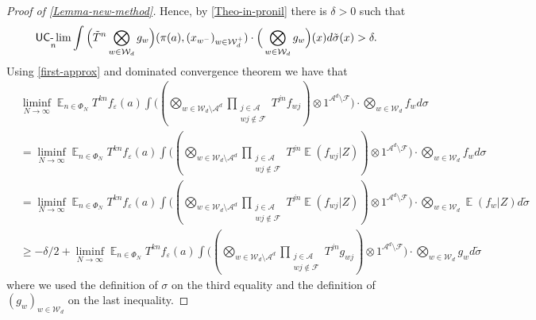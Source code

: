 \documentclass[letter,11pt]{article}
\theoremstyle{definition}
\newcommand{\sF}{\mathcal{F}}
\newcommand{\sA}{\mathcal{A}}
\newcommand{\bE}{\mathop{\mathbb{E}}}
\newcommand{\uclim}{\mathop{\textup{\textsf{UC-}}\lim}}
\begin{document}
\begin{proof}[Proof of \cref{Lemma-new-method}]
Hence, by \cref{Theo-in-pronil} there is $\delta>0$ such that 
\begin{equation}\label{uniform-bound-uclim}
     \uclim_{n}\int    \Big( \tilde{T}^n  \bigotimes_{w\in \mathcal{W}_d} g_{w}\Big)(\pi(a), (x_{w^-})_{w\in \mathcal{W}_d^{+}} )\cdot \Big(\bigotimes_{w\in \mathcal{W}_d}g_{w}  \Big)(x) d\tilde{\sigma}(x)  >\delta.
\end{equation}
Using \cref{first-approx} and dominated convergence theorem we have that 
\begin{align*}
    & \liminf_{N\to\infty}  \bE_{n\in \Phi_N}  T^{kn} f_\varepsilon(a) \int  \Big( (\bigotimes_{w\in \mathcal{W}_{d}\setminus\sA^d}  \prod_{\substack{j\in\sA\\wj\notin \sF}} T^{jn}f_{wj} )\otimes 1^{\sA^d\setminus \sF} \Big) \cdot  \bigotimes_{w\in \mathcal{W}_d}f_{w}d\sigma \\
    & =\liminf_{N\to\infty}  \bE_{n\in \Phi_N}  T^{kn} f_\varepsilon(a) \int  \Big( (\bigotimes_{w\in \mathcal{W}_{d}\setminus\sA^d}  \prod_{\substack{j\in\sA\\ wj\notin \sF}}T^{jn}\bE(f_{wj}|Z) )\otimes 1^{\sA^d\setminus \sF} \Big) \cdot \bigotimes_{w\in \mathcal{W}_d}f_{w}d\sigma \\
    & =\liminf_{N\to\infty}  \bE_{n\in \Phi_N}  T^{kn} f_\varepsilon(a) \int  \Big( (\bigotimes_{w\in \mathcal{W}_{d}\setminus\sA^d}  \prod_{\substack{j\in\sA\\ wj\notin \sF}}T^{jn}\bE(f_{wj}|Z) )\otimes 1^{\sA^d\setminus \sF} \Big) \cdot \bigotimes_{w\in \mathcal{W}_d}\bE(f_{w}|Z)d\tilde{\sigma} \\
    &\geq - \delta/2 + \liminf_{N\to\infty}  \bE_{n\in \Phi_N}  T^{kn} f_\varepsilon(a) \int  \Big( (\bigotimes_{w\in \mathcal{W}_{d}\setminus\sA^d}  \prod_{\substack{j\in\sA\\ wj\notin \sF}}T^{jn}g_{wj} )\otimes 1^{\sA^d\setminus \sF} \Big) \cdot \bigotimes_{w\in \mathcal{W}_d}g_{w}d\tilde{\sigma}
\end{align*}
where we used the definition of $\sigma$ on the third equality and the definition of $(g_w)_{w\in \mathcal{W}_d}$ on the last inequality. 


\end{proof}
\end{document}
